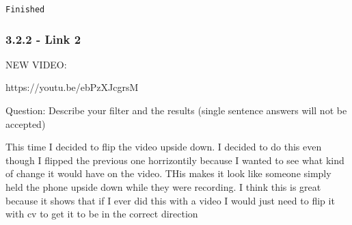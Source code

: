 \documentclass[11pt]{article}
\begin{document}
    \begin{Verbatim}[commandchars=\\\{\}]
Finished

    \end{Verbatim}

    \subsubsection{3.2.2 - Link 2}\label{link-2}

    NEW VIDEO:

https://youtu.be/ebPzXJcgrsM

Question: Describe your filter and the results (single sentence answers
will not be accepted)

This time I decided to flip the video upside down. I decided to do this
even though I flipped the previous one horrizontily because I wanted to
see what kind of change it would have on the video. THis makes it look
like someone simply held the phone upside down while they were
recording. I think this is great because it shows that if I ever did
this with a video I would just need to flip it with cv to get it to be
in the correct direction
\end{document}
